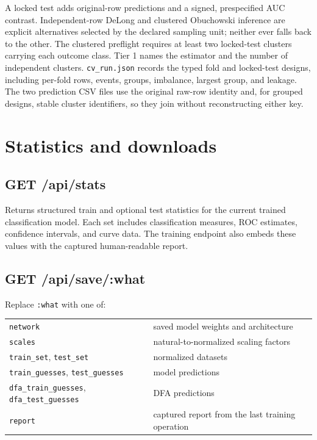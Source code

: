 A locked test adds original-row predictions and a signed,
prespecified AUC contrast.  Independent-row DeLong and clustered
Obuchowski inference are explicit alternatives selected by the
declared sampling unit; neither ever falls back to the other.  The
clustered preflight requires at least two locked-test clusters carrying
each outcome class.  Tier 1 names the estimator and the number of
independent clusters.  \texttt{cv\_run.json} records the typed fold and
locked-test designs, including per-fold rows, events, groups,
imbalance, largest group, and leakage.  The two prediction CSV files
use the original raw-row identity and, for grouped designs, stable
cluster identifiers, so they join without reconstructing either key.

\section{Statistics and downloads}

\subsection{GET /api/stats}

Returns structured train and optional test statistics for the current
trained classification model.  Each set includes classification
measures, ROC estimates, confidence intervals, and curve data.  The
training endpoint also embeds these values with the captured
human-readable report.

\subsection{GET /api/save/:what}

Replace \texttt{:what} with one of:

\begin{center}
\begin{tabular}{ll}
\texttt{network} & saved model weights and architecture \\
\texttt{scales} & natural-to-normalized scaling factors \\
\texttt{train\_set}, \texttt{test\_set} & normalized datasets \\
\texttt{train\_guesses}, \texttt{test\_guesses} & model predictions \\
\texttt{dfa\_train\_guesses}, \texttt{dfa\_test\_guesses} & DFA predictions \\
\texttt{report} & captured report from the last training operation \\
\end{tabular}
\end{center}

